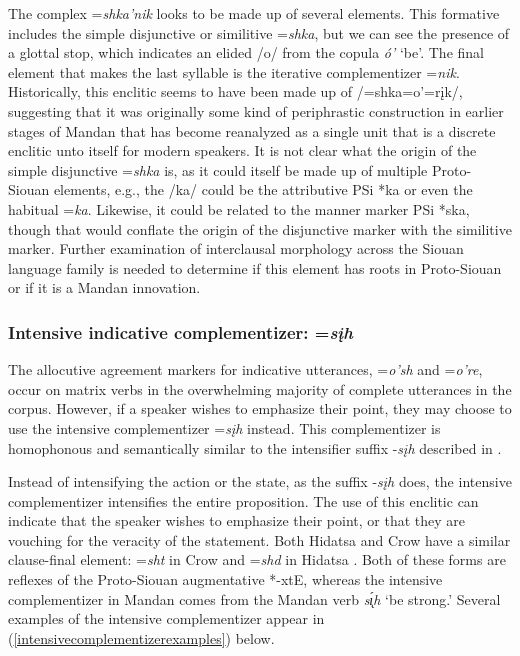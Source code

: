 The complex =\textit{shka'nik} looks to be made up of several elements. This formative includes the simple disjunctive or similitive =\textit{shka}, but we can see the presence of a glottal stop, which indicates an elided /o/ from the copula \textit{ó'} `be'. The final element that makes the last syllable is the iterative complementizer =\textit{nik}. Historically, this enclitic seems to have been made up of /=shka=o'=rįk/, suggesting that it was originally some kind of periphrastic construction in earlier stages of Mandan that has become reanalyzed as a single unit that is a discrete enclitic unto itself for modern speakers. It is not clear what the origin of the simple disjunctive =\textit{shka} is, as it could itself be made up of multiple Proto-Siouan elements, e.g., the /ka/ could be the attributive PSi *ka or even the habitual =\textit{ka}. Likewise, it could be related to the manner marker PSi *ska, though that would conflate the origin of the disjunctive marker with the similitive marker. Further examination of interclausal morphology across the Siouan language family is needed to determine if this element has roots in Proto-Siouan or if it is a Mandan innovation.

\subsubsection{Intensive indicative complementizer: =\textit{sįh}}\label{intensivecomplementizer}

The allocutive agreement markers for indicative utterances, =\textit{o'sh} and =\textit{o're}, occur on matrix verbs in the overwhelming majority of complete utterances in the corpus. However, if a speaker wishes to emphasize their point, they may choose to use the intensive complementizer =\textit{sįh} instead. This complementizer is homophonous and semantically similar to the intensifier suffix -\textit{sįh} described in .

Instead of intensifying the action or the state, as the suffix -\textit{sįh} does, the intensive complementizer intensifies the entire proposition. The use of this enclitic can indicate that the speaker wishes to emphasize their point, or that they are vouching for the veracity of the statement. Both Hidatsa and Crow have a similar clause-final element: =\textit{sht} in Crow \citep[394]{graczyk2007} and =\textit{shd} in Hidatsa \citep[231]{park2012}. Both of these forms are reflexes of the Proto-Siouan augmentative *-xtE, whereas the intensive complementizer in Mandan comes from the Mandan verb \textit{s\'{ı̨}h} `be strong.' Several examples of the intensive complementizer appear in (\ref{intensivecomplementizerexamples}) below.

